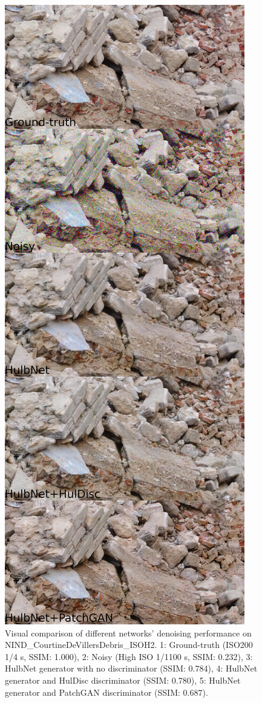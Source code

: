 \begin{figure}[!htbp]
\centering
\includegraphics[width=1\linewidth,height=0.9\textheight,keepaspectratio]{gfx/comp/NIND_CourtineDeVillersDebris_ISOH2-cgan.jpg}
\caption[Denoising CourtineDeVillersDebris with cGANs (visual comparison)]{Visual comparison of different networks' denoising performance on NIND\_CourtineDeVillersDebris\_ISOH2. 1: Ground-truth (ISO200 1/4 s, SSIM: 1.000), 2: Noisy (High ISO 1/1100 s, SSIM: 0.232), 3: HulbNet generator with no discriminator (SSIM: 0.784), 4: HulbNet generator and HulDisc discriminator (SSIM: 0.780), 5: HulbNet generator and PatchGAN discriminator (SSIM: 0.687).}
\label{fig:cgan-wall}
\end{figure}

